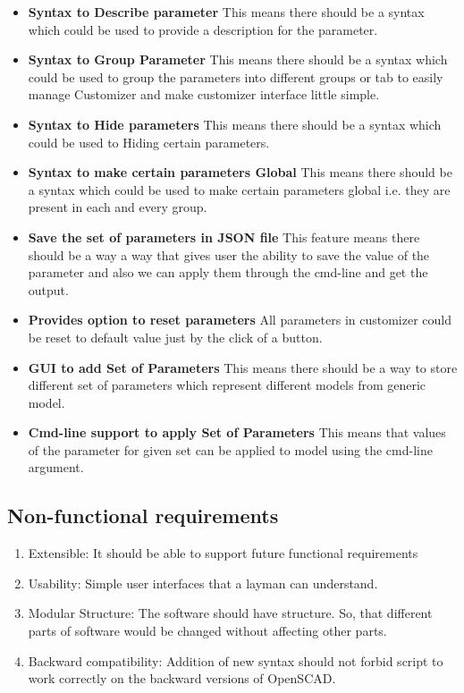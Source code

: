 \begin{itemize}
\begin{enumerate}
    \end{enumerate}
    \item {\bf Syntax to Describe parameter}
        This means there should be a syntax which could be used to provide a description for the parameter.
    \item \textbf{Syntax to Group Parameter}
        This means there should be a syntax which could be used to group the parameters into different groups or tab to easily manage Customizer and make customizer interface little simple.
    \item \textbf{Syntax to Hide parameters}
        This means there should be a syntax which could be used to Hiding certain parameters.
    \item \textbf{Syntax to make certain parameters Global}
        This means there should be a syntax which could be used to make certain parameters global i.e. they are present in each and every group.
    \item \textbf{Save the set of parameters in JSON file}
    This feature means there should be a way a way that gives user the ability to save the value of the parameter and also we can apply them through the cmd-line and get the output.
	
	\item\textbf{ Provides option to reset parameters} All parameters in customizer could be reset to
	default value just by the click of a button.
    \item \textbf{GUI to add Set of Parameters}
        This means there should be a way to store different set of parameters which represent different models from generic model.
  \item \textbf{ Cmd-line support to apply Set of Parameters} This means that values of
    the parameter for given set can be applied to model using the cmd-line argument.
    \end{itemize}
\subsection{Non-functional requirements}
\begin{enumerate}
    \item Extensible: It should be able to support future functional requirements
    \item Usability: Simple user interfaces that a layman can understand.
    \item Modular Structure: The software should have  structure. So, that different parts of software would be changed without affecting other parts.
    \item Backward compatibility: Addition of new syntax should not forbid script to work correctly on the backward versions of OpenSCAD.
\end{enumerate}

